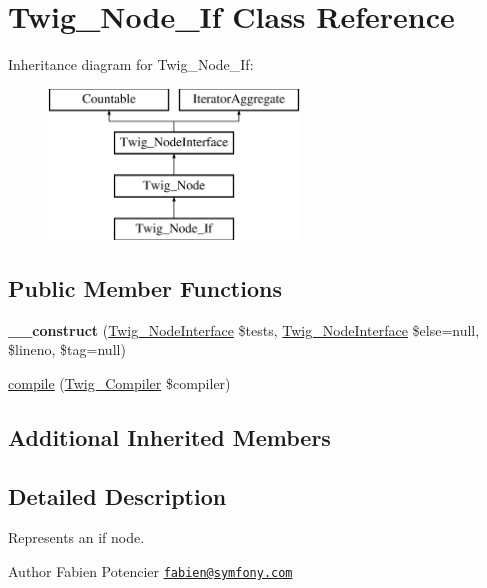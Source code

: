\hypertarget{class_twig___node___if}{}\section{Twig\+\_\+\+Node\+\_\+\+If Class Reference}
\label{class_twig___node___if}
Inheritance diagram for Twig\+\_\+\+Node\+\_\+\+If\+:\begin{figure}[H]
\begin{center}
\leavevmode
\includegraphics[height=4.000000cm]{class_twig___node___if}
\end{center}
\end{figure}
\subsection*{Public Member Functions}
\begin{DoxyCompactItemize}
\item 
\hypertarget{class_twig___node___if_a1648ddaaa3a887d40354ef06784bd0a9}{}{\bfseries \+\_\+\+\_\+construct} (\hyperlink{interface_twig___node_interface}{Twig\+\_\+\+Node\+Interface} \$tests, \hyperlink{interface_twig___node_interface}{Twig\+\_\+\+Node\+Interface} \$else=null, \$lineno, \$tag=null)\label{class_twig___node___if_a1648ddaaa3a887d40354ef06784bd0a9}

\item 
\hyperlink{class_twig___node___if_a4e0faa87c3fae583620b84d3607085da}{compile} (\hyperlink{class_twig___compiler}{Twig\+\_\+\+Compiler} \$compiler)
\end{DoxyCompactItemize}
\subsection*{Additional Inherited Members}


\subsection{Detailed Description}
Represents an if node.

\begin{DoxyAuthor}{Author}
Fabien Potencier \href{mailto:fabien@symfony.com}{\tt fabien@symfony.\+com} 
\end{DoxyAuthor}


